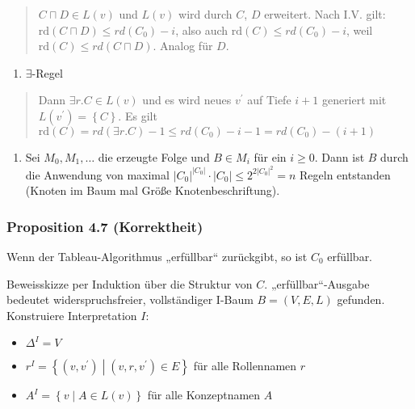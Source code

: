\begin{quote}
$C \sqcap D \in L(v)$ und $L(v)$ wird durch $C$, $D$ erweitert.
Nach I.V. gilt:
$\text{rd}\left( C \sqcap D \right) \leq rd\left( C_{0} \right) - i$,
also auch $\text{rd}\left( C \right) \leq rd\left( C_{0} \right) - i$,
weil $\text{rd}\left( C \right) \leq rd\left( C \sqcap D \right)$.
Analog für $D$.
\end{quote}

\begin{enumerate}
\def\labelenumi{\alph{enumi}.}
\item
  $\exists$-Regel
\end{enumerate}

\begin{quote}
Dann $\exists r.C \in L\left( v \right)$ und es wird neues $v^{'}$
auf Tiefe $i + 1$ generiert mit
$L\left( v^{'} \right) = \left\{ C \right\}$. Es gilt
$\text{rd}\left( C \right) = rd\left( \exists r.C \right) - 1 \leq rd\left( C_{0} \right) - i - 1 = rd\left( C_{0} \right) - (i + 1)$
\end{quote}

\begin{enumerate}
\def\labelenumi{\arabic{enumi}.}
\item
  Sei $M_{0},M_{1},\ldots$ die erzeugte Folge und $B \in M_{i}$ für
  ein $i \geq 0$. Dann ist $B$ durch die Anwendung von maximal
  $\left| C_{0} \right|^{\left| C_{0} \right|} \cdot \left| C_{0} \right| \leq 2^{2\left| C_{0} \right|^{2}} = n$
  Regeln entstanden (Knoten im Baum mal Größe Knotenbeschriftung).
\end{enumerate}

\hypertarget{proposition-4.7-korrektheit}{\subsubsection{Proposition 4.7
(Korrektheit)}\label{proposition-4.7-korrektheit}}

Wenn der Tableau-Algorithmus „erfüllbar`` zurückgibt, so ist $C_{0}$
erfüllbar.

Beweisskizze per Induktion über die Struktur von $C$.
„erfüllbar``-Ausgabe bedeutet widerspruchsfreier, vollständiger I-Baum
$B = \left( V,E,L \right)$ gefunden. Konstruiere Interpretation $I$:

\begin{itemize}
\item
  $\Delta^{I} = V$
\item
  $r^{I} = \left\{ \left( v,v^{'} \right) \middle| \left( v,r,v^{'} \right) \in E \right\}$
  für alle Rollennamen $r$
\item
  $A^{I} = \left\{ v \middle| A \in L\left( v \right) \right\}$ für
  alle Konzeptnamen $A$
\end{itemize}

